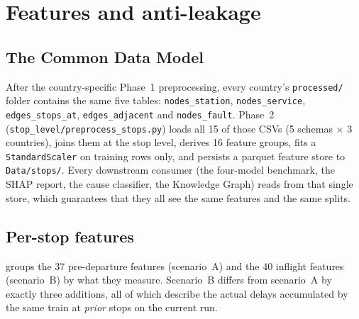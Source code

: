 \section{Features and anti-leakage}
\label{sec:features}

\subsection{The Common Data Model}

After the country-specific Phase~1 preprocessing, every country's \texttt{processed/} folder contains the same five tables: \texttt{nodes\_station}, \texttt{nodes\_service}, \texttt{edges\_stops\_at}, \texttt{edges\_adjacent} and \texttt{nodes\_fault}. Phase~2 (\texttt{stop\_level/preprocess\_stops.py}) loads all 15 of those CSVs (5 schemas $\times$ 3 countries), joins them at the stop level, derives 16 feature groups, fits a \texttt{StandardScaler} on training rows only, and persists a parquet feature store to \texttt{Data/stops/}. Every downstream consumer (the four-model benchmark, the SHAP report, the cause classifier, the Knowledge Graph) reads from that single store, which guarantees that they all see the same features and the same splits.

\subsection{Per-stop features}

 groups the 37 pre-departure features (scenario~A) and the 40 inflight features (scenario~B) by what they measure. Scenario~B differs from scenario~A by exactly three additions, all of which describe the actual delays accumulated by the same train at \emph{prior} stops on the current run.

